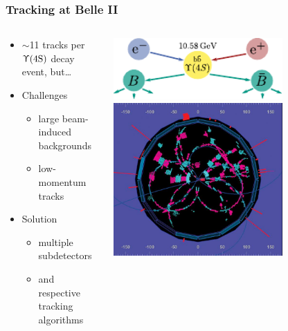 \documentclass[18pt, aspectratio=169]{beamer}
\begin{document}
\begin{frame}
  \frametitle{Tracking at Belle II}
  \begin{columns}
    \begin{column}{0.5\textwidth}
      \begin{itemize}
      \item $\sim$11 tracks per $\Upupsilon(\text{4S})$ decay event, but\ldots
      \end{itemize}
      \begin{itemize}
      \item \textcolor{kit-red100}{Challenges}
        \begin{itemize}
        \item large beam-induced backgrounds
        \item low-momentum tracks
        \end{itemize}
      \end{itemize}
      \begin{itemize}
      \item \textcolor{kit-green100}{Solution}
        \begin{itemize}
        \item multiple subdetectors
        \item and respective tracking algorithms
        \end{itemize}
      \end{itemize}
    \end{column}
    \begin{column}{0.5\textwidth}
      \centering
      \includegraphics[width=0.7\textwidth]{figures/eplus_eminus_to_b_bar_diagram.pdf}\\
      \includegraphics[width=0.7\textwidth]{figures/first_y4s.jpg}
    \end{column}
  \end{columns}
\end{frame}
\end{document}
